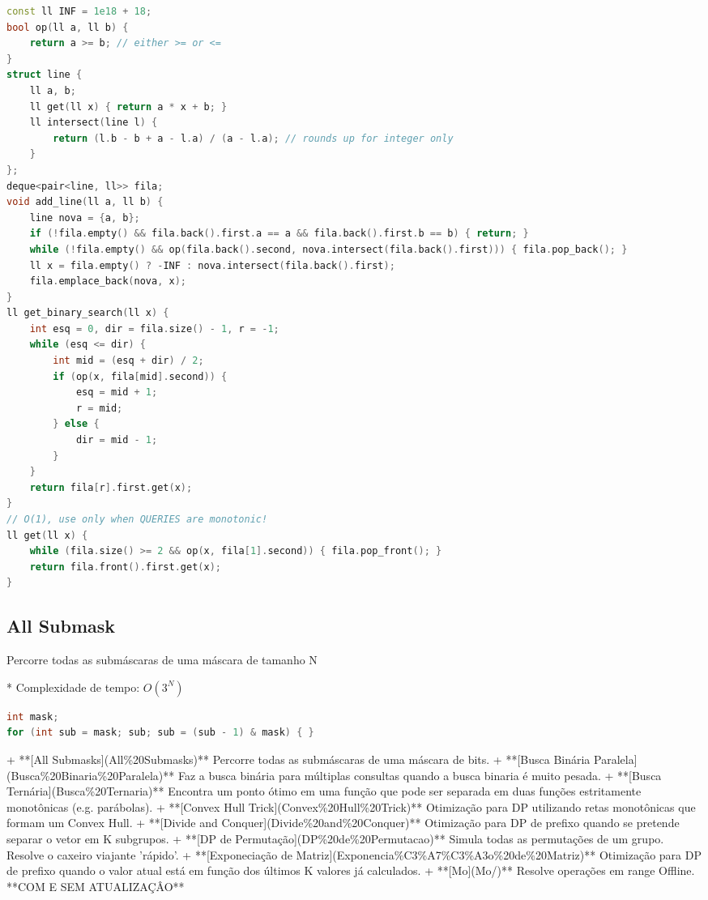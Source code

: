 \documentclass[11pt, a4paper, twoside]{article}
\begin{document}
\begin{lstlisting}[language=C++]
const ll INF = 1e18 + 18;
bool op(ll a, ll b) {
    return a >= b; // either >= or <=
}
struct line {
    ll a, b;
    ll get(ll x) { return a * x + b; }
    ll intersect(line l) {
        return (l.b - b + a - l.a) / (a - l.a); // rounds up for integer only
    }
};
deque<pair<line, ll>> fila;
void add_line(ll a, ll b) {
    line nova = {a, b};
    if (!fila.empty() && fila.back().first.a == a && fila.back().first.b == b) { return; }
    while (!fila.empty() && op(fila.back().second, nova.intersect(fila.back().first))) { fila.pop_back(); }
    ll x = fila.empty() ? -INF : nova.intersect(fila.back().first);
    fila.emplace_back(nova, x);
}
ll get_binary_search(ll x) {
    int esq = 0, dir = fila.size() - 1, r = -1;
    while (esq <= dir) {
        int mid = (esq + dir) / 2;
        if (op(x, fila[mid].second)) {
            esq = mid + 1;
            r = mid;
        } else {
            dir = mid - 1;
        }
    }
    return fila[r].first.get(x);
}
// O(1), use only when QUERIES are monotonic!
ll get(ll x) {
    while (fila.size() >= 2 && op(x, fila[1].second)) { fila.pop_front(); }
    return fila.front().first.get(x);
}
\end{lstlisting}

\subsection{All Submask}



Percorre todas as submáscaras de uma máscara de tamanho N

* Complexidade de tempo: $O(3^N)$

\begin{multicols}{2}
\begin{lstlisting}[language=C++]
int mask;
for (int sub = mask; sub; sub = (sub - 1) & mask) { }
\end{lstlisting}
\end{multicols}



+ **[All Submasks](All\%20Submasks)**  
Percorre todas as submáscaras de uma máscara de bits.
+ **[Busca Binária Paralela](Busca\%20Binaria\%20Paralela)**  
Faz a busca binária para múltiplas consultas quando a busca binaria é muito pesada.
+ **[Busca Ternária](Busca\%20Ternaria)**  
Encontra um ponto ótimo em uma função que pode ser separada em duas funções estritamente monotônicas (e.g. parábolas).
+ **[Convex Hull Trick](Convex\%20Hull\%20Trick)**  
Otimização para DP utilizando retas monotônicas que formam um Convex Hull.
+ **[Divide and Conquer](Divide\%20and\%20Conquer)**   
Otimização para DP de prefixo quando se pretende separar o vetor em K subgrupos.
+ **[DP de Permutação](DP\%20de\%20Permutacao)**  
Simula todas as permutações de um grupo. Resolve o caxeiro viajante 'rápido'.
+ **[Exponeciação de Matriz](Exponencia\%C3\%A7\%C3\%A3o\%20de\%20Matriz)**   
Otimização para DP de prefixo quando o valor atual está em função dos últimos K valores já calculados.
+ **[Mo](Mo/)**  
Resolve operações em range Offline. **COM E SEM ATUALIZAÇÂO**
\end{document}
